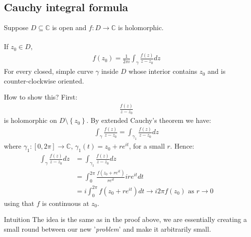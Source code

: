 \subsection{Cauchy integral formula}
\begin{theoreme}
Suppose $D \subseteq \mathbb{C}$ is open and $f : D \to \mathbb{C}$ is holomorphic.\\
$ $\\
If $z_0 \in D$,
\begin{align*} 
	f\left(z_0\right) =  \frac{1}{2\pi i}\int_{\gamma}\frac{f\left(z\right)}{z - z_0}dz
\end{align*}
For every closed, simple curve $\gamma$ inside $D$ whose interior contains $z_0$ and is counter-clockwise oriented.
\end{theoreme}
\begin{parag}{How to show this?}
    First:
	\begin{align*} 
		\frac{f\left(z\right)}{z - z_0}
	\end{align*}
	is holomorphic on $D \setminus \left\{z_0\right\}$. By extended Cauchy's theorem we have:
	\begin{align*} 
		\int_\gamma \frac{f\left(z\right)}{z - z_0} =  \int_{\gamma_1} \frac{f\left(z\right)}{z - z_0}dz
	\end{align*}
	where $\gamma_1 : \left[0, 2\pi\right] \to \mathbb{C}$, $\gamma_1\left(t\right) =  z_0 + re^{it}$, for a small $r$. Hence:
	\begin{align*} 
		\int_\gamma \frac{f\left(z\right)}{z - z_0} dz &=  \int_{\gamma_1}\frac{f\left(z\right)}{z - z_0}dz\\
		&= \int_0^{2\pi}\frac{f\left(z_0 + re^{it}\right)}{re^{it}}ire^{it}dt\\
		&= i \int_0^{2\pi} f\left(z_0 + re^{it}\right) dt \to i2\pi f\left(z_0\right) \text{ as }  r \to 0
	\end{align*}
	using that $f$ is continuous at $z_0$.
	\begin{subparag}{Intuition}
		The idea is the same as in the proof above, we are essentially creating a small round between our new '\textit{problem}' and make it arbitrarily small.
	\end{subparag}
\end{parag}



